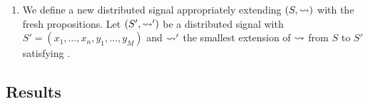 \begin{enumerate}[label=\arabic*.]
	\item
	We define a new distributed signal appropriately extending $(S,{\rightsquigarrow})$ with the fresh propositions.
	Let $(S', {\rightsquigarrow}')$ be a distributed signal with $S' = (x_1, \ldots, x_n, y_1, \ldots, y_M)$ and ${\rightsquigarrow}'$ the smallest extension of ${\rightsquigarrow}$ from $S$ to $S'$ satisfying . 
	
\end{enumerate}

\subsection{Results}

\TODO